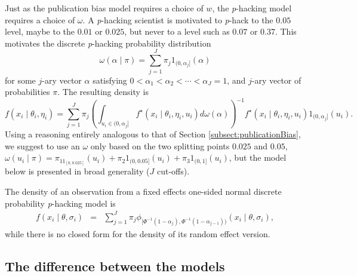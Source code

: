 \documentclass[useAMS,usenatbib,referee]{biom}
\begin{document}
Just as the publication bias model requires a choice of $w$, the \textit{p}-hacking model requires a choice of $\omega$. A \textit{p}-hacking scientist is motivated to \textit{p}-hack to the $0.05$ level, maybe to the $0.01$ or $0.025$, but never to a level such as $0.07$ or $0.37$. This motivates the discrete \textit{p}-hacking probability distribution
$$\omega(\alpha\mid\pi)=\sum_{j=1}^{J}\pi_{j}1_{(0,\alpha_{j}]}(\alpha)$$
for some $j$-ary vector $\alpha$ satisfying $0<\alpha_{1}<\alpha_{2}<\cdots<\alpha_{J}=1$,
and $j$-ary vector of probabilities $\pi$. The resulting density is 
\[
f(x_{i}\mid\theta_{i},\eta_{i})=\sum_{j=1}^{J}\pi_{j}\left(\int_{u_i\in(0,\alpha_{j}]}f^\star(x_{i}\mid\theta_{i},\eta_{i}, u_i)d\omega(\alpha)\right)^{-1}f^\star(x_{i}\mid\theta_{i},\eta_{i}, u_i)1_{(0,\alpha_{j}]}(u_i).
\]
Using a reasoning entirely analogous to that of Section \ref{subsect:publicationBias}, we suggest to use an $\omega$ only based on the two splitting points $0.025$ and $0.05$, $\omega(u_i\mid\pi) = \pi_11_{[0,0.025]}(u_i) + \pi_{2}1_{(0,0.05]}(u_i) + \pi_{3}1_{(0,1]}(u_i)$, but the model below is presented in broad generality ($J$ cut-offs).

The density of an observation from a fixed effects one-sided normal discrete probability \textit{p}-hacking model is
\begin{eqnarray}
f(x_{i}\mid\theta,\sigma_{i}) & = & \sum_{j=1}^{J}\pi_{j}\phi_{[\Phi^{-1}(1-\alpha_{j}),\Phi^{-1}(1-\alpha_{j-1}))}(x_{i}\mid\theta,\sigma_{i}),\label{eq:Fixed effects, p-hacking}
\end{eqnarray}
while there is no closed form for the density of its random effect version.

\subsection{The difference between the models\label{subsec:Selection sets, meta analysis}}


\end{document}
